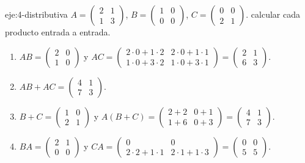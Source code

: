 \begin{solucion}{eje:4-distributiva}
\datos $A=\begin{pmatrix}2&1\\1&3\end{pmatrix}$, $B=\begin{pmatrix}1&0\\0&0\end{pmatrix}$, $C=\begin{pmatrix}0&0\\2&1\end{pmatrix}$.
\planteamiento calcular cada producto entrada a entrada.
\pasos
\begin{enumerate}[label=\arabic*.]
  \item $AB=\begin{pmatrix}2&0\\1&0\end{pmatrix}$ y $AC=\begin{pmatrix}2\cdot 0+1\cdot 2&2\cdot 0+1\cdot 1\\1\cdot 0+3\cdot 2&1\cdot 0+3\cdot 1\end{pmatrix}=\begin{pmatrix}2&1\\6&3\end{pmatrix}$.
  \item $AB+AC=\begin{pmatrix}4&1\\7&3\end{pmatrix}$.
  \item $B+C=\begin{pmatrix}1&0\\2&1\end{pmatrix}$ y $A(B+C)=\begin{pmatrix}2+2&0+1\\1+6&0+3\end{pmatrix}=\begin{pmatrix}4&1\\7&3\end{pmatrix}$.
  \item $BA=\begin{pmatrix}2&1\\0&0\end{pmatrix}$ y $CA=\begin{pmatrix}0&0\\2\cdot 2+1\cdot 1&2\cdot 1+1\cdot 3\end{pmatrix}=\begin{pmatrix}0&0\\5&5\end{pmatrix}$.

\end{enumerate}
\end{solucion}
